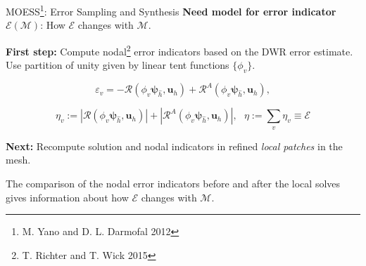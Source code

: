 \documentclass{beamer}
\newcounter{sectionframecount}
\begin{document}
\begin{frame}[t]{MOESS\footnote{M. Yano and D. L. Darmofal 2012}: Error Sampling and Synthesis}
\vspace{-5pt}
\textbf{Need model for error indicator $\mathcal{E}(\mathcal{M})$}: How $\mathcal{E}$ changes with $\mathcal{M}$.

{
\vspace{10pt}
\textbf{First step:} Compute nodal\footnote{T. Richter and T. Wick 2015} error indicators based on the DWR error estimate. Use partition of unity given by linear tent functions $\{\phi_v\}$.
}

{
\begin{equation}
  \varepsilon_v = -\mathcal{R}(\phi_v \boldsymbol{\psi}_{\hat{h}},\boldsymbol{u}_h) + \mathcal{R}^A(\phi_v\boldsymbol{\psi}_{\hat{h}},\boldsymbol{u}_h),
  \label{e:corrected_dwr_nodal}
\end{equation}

\begin{equation}
  \eta_v := |\mathcal{R}(\phi_v \boldsymbol{\psi}_{\hat{h}},\boldsymbol{u}_h)| + |\mathcal{R}^A(\phi_v\boldsymbol{\psi}_{\hat{h}},\boldsymbol{u}_h)|,~~~ \eta := \sum_{v} \eta_v \equiv \mathcal{E}
  \label{e:corrected_dwr_nodal}
\end{equation}
}

{
\textbf{Next:} Recompute solution and nodal indicators in refined \textit{local patches} in the mesh.

\vspace{5pt}
The comparison of the nodal error indicators before and after the local solves gives information about how $\mathcal{E}$ changes with $\mathcal{M}$.
}
\end{frame}

\end{document}

